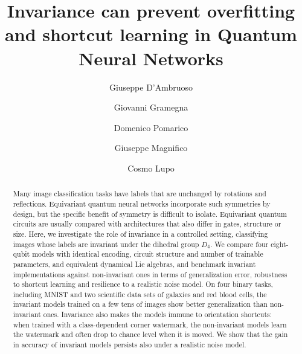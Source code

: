 \documentclass[aps,pra,reprint,superscriptaddress,longbibliography]{revtex4-2}
\begin{document}
\title{Invariance can prevent overfitting and shortcut learning in Quantum Neural Networks}

\author{Giuseppe D'Ambruoso}

\author{Giovanni Gramegna}

\author{Domenico Pomarico}

\author{Giuseppe Magnifico}

\author{Cosmo Lupo}


\begin{abstract}
Many image classification tasks have labels that are unchanged by rotations and reflections. Equivariant quantum neural networks incorporate such symmetries by design, but the specific benefit of symmetry is difficult to isolate. Equivariant quantum circuits are usually compared with architectures that also differ in gates, structure or size. Here, we investigate the role of invariance in a controlled setting, classifying images whose labels are invariant under the dihedral group $D_4$. We compare four eight-qubit models with identical encoding, circuit structure and number of trainable parameters, and equivalent dynamical Lie algebras, and benchmark invariant implementations against non-invariant ones in terms of generalization error, robustness to shortcut learning and resilience to a realistic noise model. On four binary tasks, including MNIST and two scientific data sets of galaxies and red blood cells, the invariant models trained on a few tens of images show better generalization than non-invariant ones. Invariance also makes the models immune to orientation shortcuts: when trained with a class-dependent corner watermark, the non-invariant models learn the watermark and often drop to chance level when it is moved. We show that the gain in accuracy of invariant models persists also under a realistic noise model.
\end{abstract}
\end{document}
